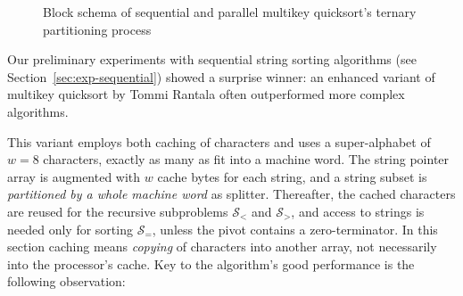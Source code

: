 \documentclass[a4paper]{myjournal}
\newcommand{\Strings}{\mathcal{S}}
\begin{document}
\begin{figure}
   \caption{Block schema of sequential and parallel multikey quicksort's ternary
    partitioning process}\label{fig:mkqs-blocks}
\end{figure}

Our preliminary experiments with sequential string sorting algorithms (see
Section~\ref{sec:exp-sequential}) showed a surprise winner: an enhanced variant
of multikey quicksort by Tommi Rantala \cite{rantala2007web} often outperformed
more complex algorithms.

This variant employs both caching of characters and uses a super-alphabet of $w
= 8$ characters, exactly as many as fit into a machine word. The string pointer
array is augmented with $w$ cache bytes for each string, and a string subset is
\emph{partitioned by a whole machine word} as splitter. Thereafter, the cached
characters are reused for the recursive subproblems $\Strings_<$ and
$\Strings_>$, and access to strings is needed only for sorting $\Strings_=$,
unless the pivot contains a zero-terminator.  In this section caching means
\emph{copying} of characters into another array, not necessarily into the
processor's cache. Key to the algorithm's good performance is the following
observation:
\end{document}
